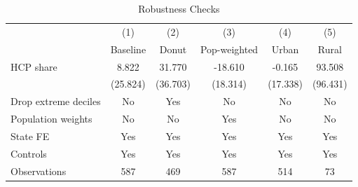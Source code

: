 \begin{table}[t]
\centering
\caption{Robustness Checks}
\label{tab:robustness}
\small
\begin{tabular}{lccccc}
\hline\hline
  & (1) & (2) & (3) & (4) & (5) \\
  & Baseline & Donut & Pop-weighted & Urban & Rural \\
\hline
  HCP share & 8.822 & 31.770 & -18.610 & -0.165 & 93.508 \\
  & (25.824) & (36.703) & (18.314) & (17.338) & (96.431) \\
\addlinespace[4pt]
  Drop extreme deciles & No & Yes & No & No & No \\
  Population weights & No & No & Yes & No & No \\
  State FE & Yes & Yes & Yes & Yes & Yes \\
  Controls & Yes & Yes & Yes & Yes & Yes \\
  Observations & 587 & 469 & 587 & 514 & 73 \\
\hline\hline
\end{tabular}
\par{}
\end{table}
